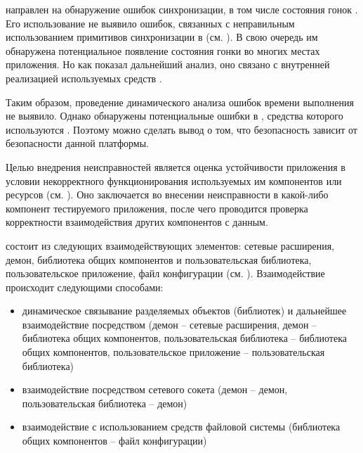 %
 направлен на обнаружение ошибок синхронизации, в том числе состояния гонок . 
%
Его использование не выявило ошибок, связанных с неправильным использованием примитивов синхронизации в  (см. ). 
%
В свою очередь им обнаружена потенциальное появление состояния гонки во многих местах приложения. 
%
Но как показал дальнейший анализ, оно связано с внутренней реализацией используемых средств . 

%
Таким образом, проведение динамического анализа  ошибок времени выполнения не выявило. 
%
Однако обнаружены потенциальные ошибки в , средства которого используются . 
%
Поэтому можно сделать вывод о том, что безопасность  зависит от безопасности данной платформы.  



%
Целью внедрения неисправностей является оценка устойчивости приложения в условии некорректного функционирования используемых им компонентов или ресурсов (см. ). 
%
Оно заключается во внесении неисправности в какой-либо компонент тестируемого приложения, после чего проводится проверка корректности взаимодействия других компонентов с данным. 

%
 состоит из следующих взаимодействующих элементов: сетевые расширения, демон, библиотека общих компонентов и пользовательская библиотека, пользовательское приложение, файл конфигурации (см. ). 
%
Взаимодействие происходит следующими способами:
\begin{itemize}
	\setlength{\itemsep}{0pt}%

	\item динамическое связывание разделяемых объектов (библиотек) и дальнейшее взаимодействие посредством  (демон -- сетевые расширения, демон -- библиотека общих компонентов, пользовательская библиотека -- библиотека общих компонентов, пользовательское приложение -- пользовательская библиотека)
	\item взаимодействие посредством сетевого сокета (демон -- демон, пользовательская библиотека -- демон)
	\item взаимодействие с использованием средств файловой системы (библиотека общих компонентов -- файл конфигурации)
\end{itemize}

